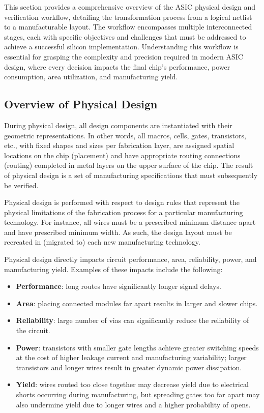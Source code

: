 This section provides a comprehensive overview of the ASIC physical design and verification workflow, detailing the transformation process from a logical netlist to a manufacturable layout. The workflow encompasses multiple interconnected stages, each with specific objectives and challenges that must be addressed to achieve a successful silicon implementation. Understanding this workflow is essential for grasping the complexity and precision required in modern ASIC design, where every decision impacts the final chip's performance, power consumption, area utilization, and manufacturing yield.

\subsection{Overview of Physical Design}
During physical design, all design components are instantiated with their geometric representations. In other words, all macros, cells, gates, transistors, etc., with fixed shapes and sizes per fabrication layer, are assigned spatial locations on the chip (placement) and have appropriate routing connections (routing) completed in metal layers on the upper surface of the chip. The result of physical design is a set of manufacturing specifications that must subsequently be verified.

Physical design is performed with respect to design rules that represent the physical limitations of the fabrication process for a particular manufacturing technology. For instance, all wires must be a prescribed minimum distance apart and have prescribed minimum width. As such, the design layout must be recreated in (migrated to) each new manufacturing technology.

Physical design directly impacts circuit performance, area, reliability, power, and manufacturing yield. Examples of these impacts include the following:

\begin{itemize}
    \item \textbf{Performance}: long routes have significantly longer signal delays.
    \item \textbf{Area}: placing connected modules far apart results in larger and slower chips.
    \item \textbf{Reliability}: large number of vias can significantly reduce the reliability of the circuit.
    \item \textbf{Power}: transistors with smaller gate lengths achieve greater switching speeds at the cost of higher leakage current and manufacturing variability; larger transistors and longer wires result in greater dynamic power dissipation.
    \item \textbf{Yield}: wires routed too close together may decrease yield due to electrical shorts occurring during manufacturing, but spreading gates too far apart may also undermine yield due to longer wires and a higher probability of opens.
\end{itemize}

